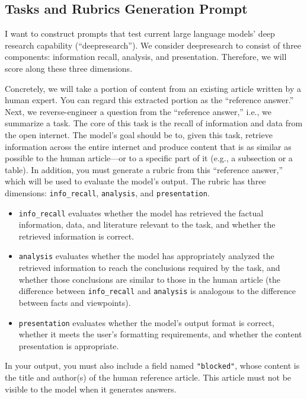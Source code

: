 \documentclass[11pt]{article}
\begin{document}
\subsection{Tasks and Rubrics Generation Prompt}
\begin{tcolorbox}[
  breakable,
  colback=porcelain,
  colframe=gray!75!black,
  left=6pt, right=6pt, top=6pt, bottom=6pt,
  fontupper=\small
]

I want to construct prompts that test current large language models' deep research capability (``deepresearch''). We consider deepresearch to consist of three components: information recall, analysis, and presentation. Therefore, we will score along these three dimensions.

Concretely, we will take a portion of content from an existing article written by a human expert. You can regard this extracted portion as the ``reference answer.'' Next, we reverse-engineer a question from the ``reference answer,'' i.e., we summarize a task. The core of this task is the recall of information and data from the open internet. The model's goal should be to, given this task, retrieve information across the entire internet and produce content that is as similar as possible to the human article---or to a specific part of it (e.g., a subsection or a table). In addition, you must generate a rubric from this ``reference answer,'' which will be used to evaluate the model's output. The rubric has three dimensions: \texttt{info\_recall}, \texttt{analysis}, and \texttt{presentation}. 

\begin{itemize}
\item \texttt{info\_recall} evaluates whether the model has retrieved the factual information, data, and literature relevant to the task, and whether the retrieved information is correct.
\item \texttt{analysis} evaluates whether the model has appropriately analyzed the retrieved information to reach the conclusions required by the task, and whether those conclusions are similar to those in the human article (the difference between \texttt{info\_recall} and \texttt{analysis} is analogous to the difference between facts and viewpoints).
\item \texttt{presentation} evaluates whether the model's output format is correct, whether it meets the user's formatting requirements, and whether the content presentation is appropriate.
\end{itemize}

In your output, you must also include a field named \texttt{"blocked"}, whose content is the title and author(s) of the human reference article. This article must not be visible to the model when it generates answers.


\end{tcolorbox}
\end{document}
